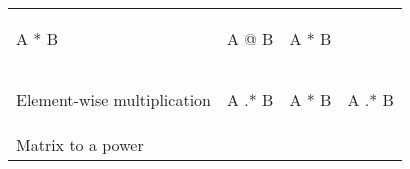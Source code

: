 \documentclass[10pt, landscape]{article}
\newenvironment{Shaded}{}{}
\newcommand{\OperatorTok}[1]{\textcolor[rgb]{0.40,0.40,0.40}{{#1}}}
\newcommand{\NormalTok}[1]{{#1}}
\begin{document}
\begin{multicols}{2}
\begin{tabular}[ ]{@{}llll@{}}
\begin{minipage}[t]{0.22\columnwidth}
\begin{Shaded}
\begin{Highlighting}[]
\NormalTok{A * B}
\end{Highlighting}
\end{Shaded}
\strut
\end{minipage} & \begin{minipage}[t]{0.23\columnwidth}\raggedright\strut
\begin{Shaded}
\begin{Highlighting}[]
\NormalTok{A @ B}
\end{Highlighting}
\end{Shaded}
\strut
\end{minipage} & \begin{minipage}[t]{0.20\columnwidth}\raggedright\strut
\begin{Shaded}
\begin{Highlighting}[]
\NormalTok{A * B}
\end{Highlighting}
\end{Shaded}
\strut
\end{minipage}\tabularnewline
\begin{minipage}[t]{0.23\columnwidth}\raggedright\strut
Element-wise multiplication\strut
\end{minipage} & \begin{minipage}[t]{0.22\columnwidth}\raggedright\strut
\begin{Shaded}
\begin{Highlighting}[]
\NormalTok{A .* B}
\end{Highlighting}
\end{Shaded}
\strut
\end{minipage} & \begin{minipage}[t]{0.23\columnwidth}\raggedright\strut
\begin{Shaded}
\begin{Highlighting}[]
\NormalTok{A }\OperatorTok{*} \NormalTok{B}
\end{Highlighting}
\end{Shaded}
\strut
\end{minipage} & \begin{minipage}[t]{0.20\columnwidth}\raggedright\strut
\begin{Shaded}
\begin{Highlighting}[]
\NormalTok{A .* B}
\end{Highlighting}
\end{Shaded}
\strut
\end{minipage}\tabularnewline
\begin{minipage}[t]{0.23\columnwidth}\raggedright\strut
Matrix to a power\strut
\end{minipage} & \begin{minipage}[t]{0.22\columnwidth}\raggedright\strut

\end{minipage}
\end{tabular}
\end{multicols}
\end{document}
